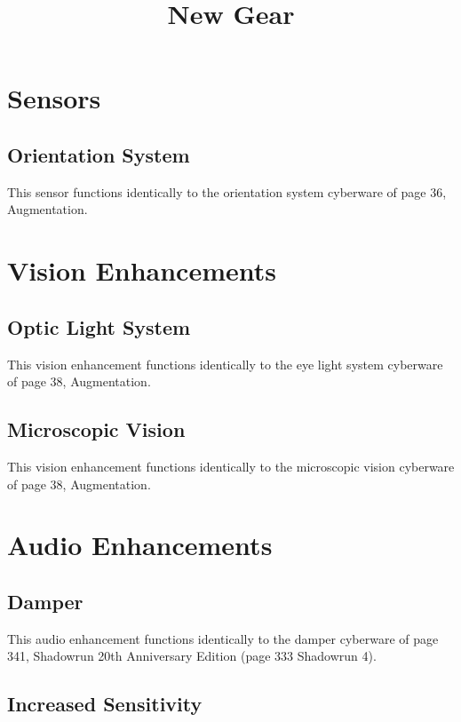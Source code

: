 \documentclass{article}
\title{New Gear}
\begin{document}
\pagestyle{empty}
\tabletail{\hline}
\tablelasttail{\hline}

\twocolumn

\section*{Sensors}

\subsection*{Orientation System}


This sensor functions identically to the orientation system cyberware of page 36, Augmentation.

\section*{Vision Enhancements}

\subsection*{Optic Light System}

This vision enhancement functions identically to the eye light system cyberware of page 38, Augmentation.

\subsection*{Microscopic Vision}

This vision enhancement functions identically to the microscopic vision cyberware of page 38, Augmentation.

\section*{Audio Enhancements}

\subsection*{Damper}

This audio enhancement functions identically to the damper cyberware of page 341, Shadowrun 20th Anniversary Edition (page 333 Shadowrun 4).

\subsection*{Increased Sensitivity}
\end{document}
